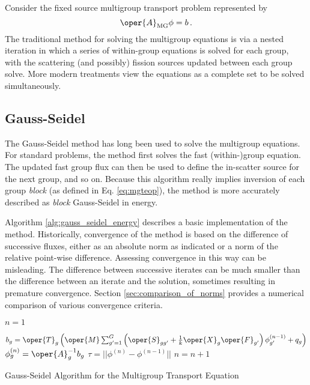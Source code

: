 Consider the fixed source multigroup transport problem
represented by
\begin{equation}
 \oper{A}_{\text{MG}} \phi = b \, .
\end{equation}
The traditional method for solving the multigroup equations is via 
a nested iteration in which a series of within-group equations is 
solved for each group, with the scattering (and possibly) fission 
sources updated between each group solve.  More modern treatments
view the equations as a complete set to be solved simultaneously.


\subsection{Gauss-Seidel}

The Gauss-Seidel method has long been used to solve the multigroup 
equations.  For standard problems, the method first solves the 
fast (within-)group equation.  The updated fast group flux can then be used 
to define the in-scatter source for the next group, and so on.  Because
this algorithm really implies inversion of each group \emph{block} (as 
defined in Eq. \ref{eq:mgteop}), the method is more accurately described 
as \emph{block} Gauss-Seidel in energy.


Algorithm \ref{alg:gauss_seidel_energy} describes a basic implementation 
of the method.  Historically, convergence of the method is based on the 
difference of successive fluxes, either as an absolute norm as indicated 
or a norm of the relative point-wise difference.  Assessing convergence 
in this way can be misleading.  The difference between successive
iterates can be much smaller than the difference between an iterate
and the solution, sometimes resulting in premature convergence.  Section 
\ref{sec:comparison_of_norms} provides a numerical comparison of various
convergence criteria.

\begin{algorithm}[h]
  \DontPrintSemicolon
  $n = 1$ \;
  {
    {
      $b_g = \oper{T}_g \left(  \oper{M} \sum_{g'=1}^G 
              \left ( \oper{S}_{gg'} + \frac{1}{k}\oper{X}_{g} \oper{F}_{g'} 
              \right )\phi^{(n-1)}_{g'} + q_g \right )$ \;
      $\phi^{(n)}_{g} = \oper{A}^{-1}_g b_g$ \;
    }
    $\tau = ||\phi^{(n)}-\phi^{(n-1)}||$\;
    $n = n + 1$\;
    
  }
  \caption{Gauss-Seidel Algorithm for the Multigroup Transport Equation}
  \label{alg:gauss_seidel_energy}
\end{algorithm}

